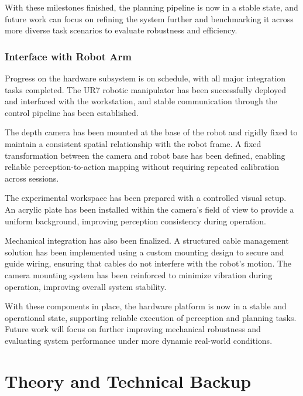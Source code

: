 \documentclass[12pt]{extarticle}
\begin{document}
With these milestones finished, the planning pipeline is now in a stable state, and future work can focus on refining the system further and benchmarking it across more diverse task scenarios to evaluate robustness and efficiency.


\subsubsection{Interface with Robot Arm}

Progress on the hardware subsystem is on schedule, with all major integration tasks completed. The UR7 robotic manipulator has been successfully deployed and interfaced with the workstation, and stable communication through the control pipeline has been established.

The depth camera has been mounted at the base of the robot and rigidly fixed to maintain a consistent spatial relationship with the robot frame. A fixed transformation between the camera and robot base has been defined, enabling reliable perception-to-action mapping without requiring repeated calibration across sessions.

The experimental workspace has been prepared with a controlled visual setup. An acrylic plate has been installed within the camera’s field of view to provide a uniform background, improving perception consistency during operation.

Mechanical integration has also been finalized. A structured cable management solution has been implemented using a custom mounting design to secure and guide wiring, ensuring that cables do not interfere with the robot’s motion. The camera mounting system has been reinforced to minimize vibration during operation, improving overall system stability.

With these components in place, the hardware platform is now in a stable and operational state, supporting reliable execution of perception and planning tasks. Future work will focus on further improving mechanical robustness and evaluating system performance under more dynamic real-world conditions.
\newpage
\section{Theory and Technical Backup}
\end{document}
